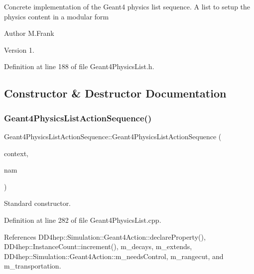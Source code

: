 Concrete implementation of the Geant4 physics list sequence. A list to setup the physics content in a modular form

\begin{DoxyAuthor}{Author}
M.\+Frank 
\end{DoxyAuthor}
\begin{DoxyVersion}{Version}
1. 
\end{DoxyVersion}


Definition at line 188 of file Geant4\+Physics\+List.\+h.



\subsection{Constructor \& Destructor Documentation}
\hypertarget{class_d_d4hep_1_1_simulation_1_1_geant4_physics_list_action_sequence_a968d2371267ba0f87b7fa60d7f855ffe}{}\label{class_d_d4hep_1_1_simulation_1_1_geant4_physics_list_action_sequence_a968d2371267ba0f87b7fa60d7f855ffe} 
\subsubsection{\texorpdfstring{Geant4\+Physics\+List\+Action\+Sequence()}{Geant4PhysicsListActionSequence()}}
{\footnotesize\ttfamily Geant4\+Physics\+List\+Action\+Sequence\+::\+Geant4\+Physics\+List\+Action\+Sequence (\begin{DoxyParamCaption}\item[{\hyperlink{class_d_d4hep_1_1_simulation_1_1_geant4_context}{Geant4\+Context} $\ast$}]{context,  }\item[{const std\+::string \&}]{nam }\end{DoxyParamCaption})}



Standard constructor. 



Definition at line 282 of file Geant4\+Physics\+List.\+cpp.



References D\+D4hep\+::\+Simulation\+::\+Geant4\+Action\+::declare\+Property(), D\+D4hep\+::\+Instance\+Count\+::increment(), m\+\_\+decays, m\+\_\+extends, D\+D4hep\+::\+Simulation\+::\+Geant4\+Action\+::m\+\_\+needs\+Control, m\+\_\+rangecut, and m\+\_\+transportation.

